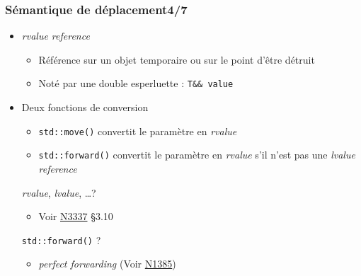 \documentclass[C++.tex]{subfiles}
\begin{document}
\begin{frame}[fragile]
	\frametitle{Sémantique de déplacement\titlehfill{}4/7}
	\begin{itemize}
		\item \textit{rvalue reference}
		\begin{itemize}
			\item Référence sur un objet temporaire ou sur le point d'être détruit
			\item Noté par une double esperluette : \lstinline|T&& value|
		\end{itemize}
		\item Deux fonctions \og de conversion\fg{}
		\begin{itemize}
			\item \lstinline|std::move()| convertit le paramètre en \textit{rvalue}


			\item \lstinline|std::forward()| convertit le paramètre en \textit{rvalue} s'il n'est pas une \textit{lvalue reference}
		\end{itemize}

		\begin{block}{\textit{rvalue}, \textit{lvalue}, \ldots ?}
			\begin{itemize}
				\item Voir \href{http://www.open-std.org/jtc1/sc22/wg21/docs/papers/2012/n3337.pdf}{N3337} §3.10
			\end{itemize}
		\end{block}

		\begin{block}{\lstinline|std::forward()| ?}
			\begin{itemize}
				\item \textit{perfect forwarding} (Voir \href{http://www.open-std.org/jtc1/sc22/wg21/docs/papers/2002/n1385.htm}{N1385})
			\end{itemize}
		\end{block}
	\end{itemize}
\end{frame}
\end{document}
